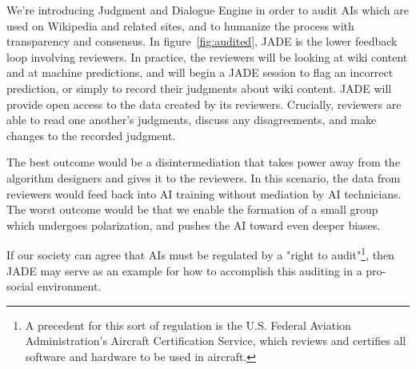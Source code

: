 \documentclass[format=sigconf]{acmart}
\begin{document}
We're introducing Judgment and Dialogue Engine in order to audit AIs which are used on Wikipedia and related sites, and to humanize the process with transparency and consensus.  In figure~\ref{fig:audited}, JADE is the lower feedback loop involving reviewers.  In practice, the reviewers will be looking at wiki content and at machine predictions, and will begin a JADE session to flag an incorrect prediction, or simply to record their judgments about wiki content.  JADE will provide open access to the data created by its reviewers.  Crucially, reviewers are able to read one another's judgments, discuss any disagreements, and make changes to the recorded judgment.

The best outcome would be a disintermediation that takes power away from the algorithm designers and gives it to the reviewers.  In this scenario, the data from reviewers would feed back into AI training without mediation by AI technicians.  The worst outcome would be that we enable the formation of a small group which undergoes polarization, and pushes the AI toward even deeper biases.

If our society can agree that AIs must be regulated by a "right to audit"\footnote{A precedent for this sort of regulation is the U.S. Federal Aviation Administration's Aircraft Certification Service, which reviews and certifies all software and hardware to be used in aircraft.}, then JADE may serve as an example for how to accomplish this auditing in a pro-social environment.


\end{document}
